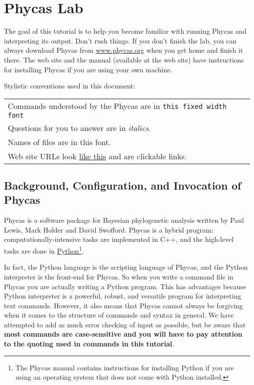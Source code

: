\documentclass{article}
\newcommand{\cmd}[1]{\texttt{#1}\xspace}
\newcommand{\phycas}{Phycas\xspace}
\newcommand{\localfile}[1]{\textsf{#1}\xspace}
\begin{document}
{\singlespacing \tableofcontents}

\newpage
\section{\phycas Lab}

The goal of this tutorial is to help you become familiar with running \phycas and interpreting its output. 
Don't rush things. 
If you don't finish the lab, you can always download 
\phycas from \href{http://www.phycas.org}{www.phycas.org} when you get home and finish it there.
The web site and the manual (available at the web site) have instructions for 
installing \phycas if you are using your own machine.

Stylistic conventions used in this document:

\begin{tabular}{l}
	Commands understood by the \phycas are in \cmd{this fixed width font} \\
	Questions for you to answer are in {\em italics}. \\
	Names of files \localfile{are in  this font}.\\
	Web site URLs look \href{http://www.google.com}{like this} and are clickable links.
\end{tabular}

\subsection{Background, Configuration, and Invocation of Phycas}
\phycas is a software package for Bayesian phylogenetic analysis written by Paul Lewis, Mark Holder and David Swofford.
\phycas is a hybrid program: computationally-intensive tasks are implemented in C++, and the high-level
tasks are done in \href{http://www.python.org/}{Python}\footnote{The Phycas manual contains instructions for installing Python if you are using an operating system
that does not come with Python installed.}.

In fact, the Python language is the scripting language of \phycas, and the Python interpreter is
the front-end for \phycas. 
So when you write a command file in \phycas you are actually writing a Python program.
This has advantages because Python interpreter is a powerful, robust, and versatile program for interpreting text commands.
However, it also means that \phycas cannot always be forgiving when it comes to the structure of commands and syntax in general.
We have attempted to add as much error checking of input as possible, but be aware that {\bf most commands are case-sensitive and you will have to pay attention to the quoting used in commands in this tutorial}.
\end{document}
